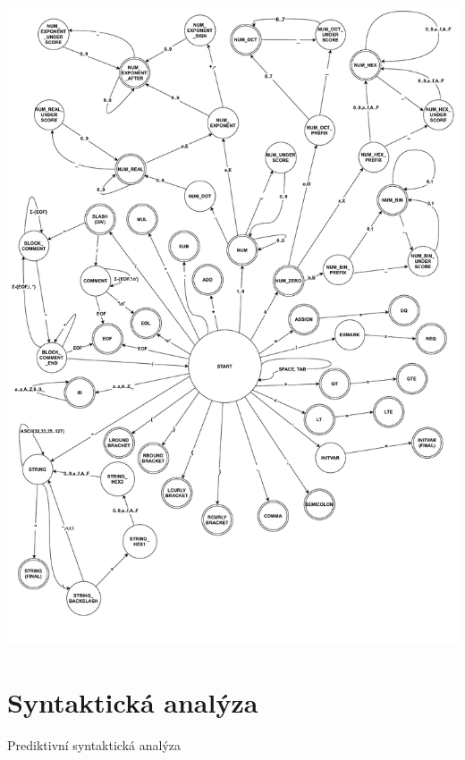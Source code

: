 \documentclass[a4paper, 12pt]{article}
\begin{document}
\includegraphics[width=\textwidth,height=\textheight,keepaspectratio]{Scanner_FSM_Graph.pdf}

\newpage

\section{Syntaktická analýza}
Prediktivní syntaktická analýza
\end{document}
